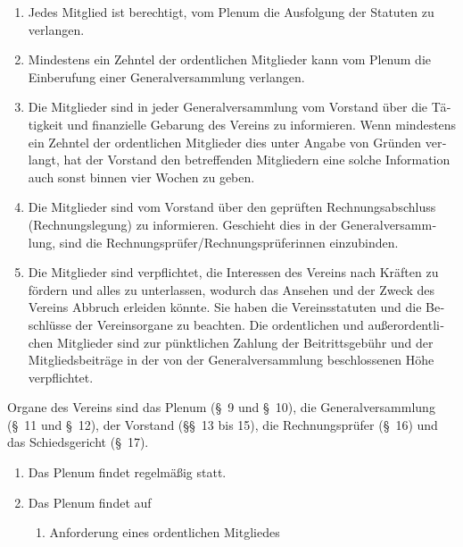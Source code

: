 \begin{otherlanguage}{german}
\begin{enumerate}[statutenenum]
    \item Jedes Mitglied ist berechtigt, vom Plenum die Ausfolgung der Statuten zu verlangen.

    \item Mindestens ein Zehntel der ordentlichen Mitglieder kann vom Plenum die Einberufung einer Generalversammlung verlangen.

    \item Die Mitglieder sind in jeder Generalversammlung vom Vorstand über die Tätigkeit und finanzielle Gebarung des Vereins zu informieren.
        Wenn mindestens ein Zehntel der ordentlichen Mitglieder dies unter Angabe von Gründen verlangt, hat der Vorstand den betreffenden Mitgliedern eine solche Information auch sonst binnen vier Wochen zu geben.

    \item Die Mitglieder sind vom Vorstand über den geprüften Rechnungsabschluss (Rechnungslegung) zu informieren.
        Geschieht dies in der Generalversammlung, sind die Rechnungsprüfer/Rechnungsprüferinnen einzubinden.

    \item Die Mitglieder sind verpflichtet, die Interessen des Vereins nach Kräften zu fördern und alles zu unterlassen, wodurch das Ansehen und der Zweck des Vereins Abbruch erleiden könnte.
        Sie haben die Vereinsstatuten und die Beschlüsse der Vereinsorgane zu beachten.
        Die ordentlichen und außerordentlichen Mitglieder sind zur pünktlichen Zahlung der Beitrittsgebühr und der Mitgliedsbeiträge in der von der Generalversammlung beschlossenen Höhe verpflichtet.
\end{enumerate}


Organe des Vereins sind das Plenum (\S\ 9 und \S\ 10), die Generalversammlung (\S\ 11 und \S\ 12), der Vorstand (\S\S\ 13 bis 15), die Rechnungsprüfer (\S\ 16) und das Schiedsgericht (\S\ 17).


\begin{enumerate}[statutenenum]
    \item Das Plenum findet regelmäßig statt.

    \item Das Plenum findet auf
        \begin{enumerate}[statutenenum]
            \item Anforderung eines ordentlichen Mitgliedes


\end{enumerate}
\end{enumerate}
\end{otherlanguage}
